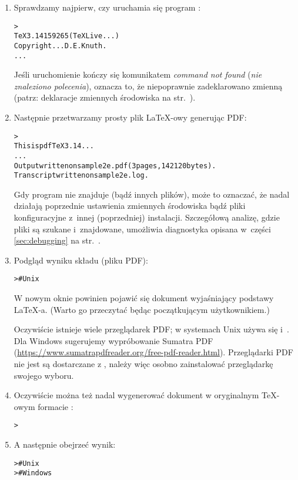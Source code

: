 \documentclass{article}
\begin{document}
\begin{enumerate}
\item Sprawdzamy najpierw, czy uruchamia się  program :
\begin{alltt}
> 
TeX 3.14159265 (TeX Live ...)
Copyright ... D.E. Knuth.
...
\end{alltt}
Jeśli uruchomienie kończy się  komunikatem \emph{command not found}
(\emph{nie znaleziono polecenia}), oznacza to, że niepoprawnie
zadeklarowano zmienną  (patrz: deklaracje zmiennych
środowiska na str.~\pageref{sec:env}).

\item Następnie przetwarzamy prosty plik \LaTeX-owy generując PDF:
\begin{alltt}
> 
This is pdfTeX 3.14...
...
Output written on sample2e.pdf (3 pages, 142120 bytes).
Transcript written on sample2e.log.
\end{alltt}
Gdy program nie znajduje  (bądź innych
plików), może to oznaczać, że nadal działają poprzednie ustawienia
zmiennych środowiska bądź pliki konfiguracyjne z~innej (poprzedniej) instalacji.
Szczegółową analizę, gdzie pliki są szukane i~znajdowane,
umożliwia diagnostyka opisana w~części \ref{sec:debugging} na
str.~\pageref{sec:debugging}.

\item Podgląd wyniku składu (pliku PDF):
\begin{alltt}
 >     # Unix
\end{alltt}

W  nowym oknie powinien pojawić się dokument wyjaśniający podstawy \LaTeX-a.
(Warto go przeczytać będąc początkującym użytkownikiem.)

Oczywiście istnieje wiele przeglądarek PDF; w systemach Unix używa się
 i~. Dla Windows sugerujemy
wypróbowanie Sumatra PDF (\url{https://www.sumatrapdfreader.org/free-pdf-reader.html}).
Przeglądarki PDF nie jest są dostarczane z \TL{}, należy więc osobno zainstalować przeglądarkę
swojego wyboru.

\item Oczywiście można też nadal wygenerować dokument w oryginalnym \TeX-owym formacie \dvi{}:
\begin{alltt}
> 
\end{alltt}

\item A następnie  obejrzeć wynik:
\begin{alltt}
>     # Unix
>   # Windows
\end{alltt}


\end{enumerate}
\end{document}
